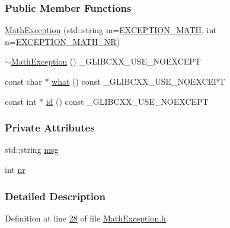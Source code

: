 \subsubsection*{Public Member Functions}
\begin{DoxyCompactItemize}
\item 
\hyperlink{class_soil_math_1_1_exception_1_1_math_exception_a27eb82d0d823880fc774381245b58968}{Math\+Exception} (std\+::string m=\hyperlink{_math_exception_8h_a5c678225d975a600ef77313d82a247b0}{E\+X\+C\+E\+P\+T\+I\+O\+N\+\_\+\+M\+A\+T\+H}, int n=\hyperlink{_math_exception_8h_a2ad831fc7963b41855b14ace07bbdf84}{E\+X\+C\+E\+P\+T\+I\+O\+N\+\_\+\+M\+A\+T\+H\+\_\+\+N\+R})
\item 
\hyperlink{class_soil_math_1_1_exception_1_1_math_exception_ac0af07cbf4a152c7e5e6e372ff73ceb8}{$\sim$\+Math\+Exception} () \+\_\+\+G\+L\+I\+B\+C\+X\+X\+\_\+\+U\+S\+E\+\_\+\+N\+O\+E\+X\+C\+E\+P\+T
\item 
const char $\ast$ \hyperlink{class_soil_math_1_1_exception_1_1_math_exception_a1b94d5f7f10fe22caa2416c9ffcb1f38}{what} () const \+\_\+\+G\+L\+I\+B\+C\+X\+X\+\_\+\+U\+S\+E\+\_\+\+N\+O\+E\+X\+C\+E\+P\+T
\item 
const int $\ast$ \hyperlink{class_soil_math_1_1_exception_1_1_math_exception_aa8666225e202dd62eca2af0f826908be}{id} () const \+\_\+\+G\+L\+I\+B\+C\+X\+X\+\_\+\+U\+S\+E\+\_\+\+N\+O\+E\+X\+C\+E\+P\+T
\end{DoxyCompactItemize}
\subsubsection*{Private Attributes}
\begin{DoxyCompactItemize}
\item 
std\+::string \hyperlink{class_soil_math_1_1_exception_1_1_math_exception_afa15e6f8ef6ac7ed599656b0ade760cc}{msg}
\item 
int \hyperlink{class_soil_math_1_1_exception_1_1_math_exception_aa9a6f85505030c25c55f2eb6e9f0aea1}{nr}
\end{DoxyCompactItemize}


\subsubsection{Detailed Description}


Definition at line \hyperlink{_math_exception_8h_source_l00028}{28} of file \hyperlink{_math_exception_8h_source}{Math\+Exception.\+h}.



